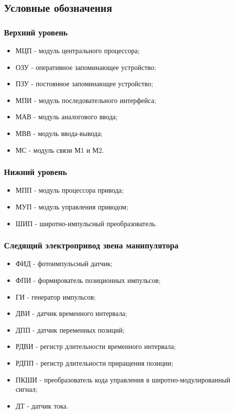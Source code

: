 \subsection*{Условные обозначения}

\subsubsection*{Верхний уровень}

\begin{itemize}
    \item МЦП - модуль центрального процессора;
    \item ОЗУ - оперативное запоминающее устройство;
    \item ПЗУ - постоянное запоминающее устройство;
    \item МПИ - модуль последовательного интерфейса;
    \item МАВ - модуль аналогового ввода;
    \item МВВ - модуль ввода-вывода;
    \item МС - модуль связи М1 и М2.
\end{itemize}

\subsubsection*{Нижний уровень}

\begin{itemize}
    \item МПП - модуль процессора привода;
    \item МУП - модуль управления приводом;
    \item ШИП - широтно-импульсный преобразователь.
\end{itemize}

\subsubsection*{Следящий электропривод звена манипулятора}
\begin{itemize}
    \item ФИД - фотоимпульсный датчик;
    \item ФПИ - формирователь позиционных импульсов;
    \item ГИ - генератор импульсов;
    \item ДВИ - датчик временного интервала;
    \item ДПП - датчик переменных позиций;
    \item РДВИ - регистр длительности временного интервала;
    \item РДПП - регистр длительности приращения позиции;
    \item ПКШИ - преобразователь кода управления в широтно-модулированный сигнал;
    \item ДТ - датчик тока.
\end{itemize}

